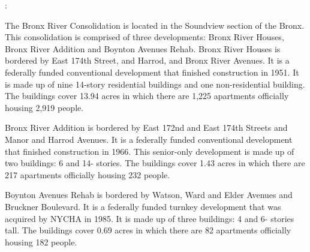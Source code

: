 :  

The Bronx River Consolidation is located in the Soundview section of the Bronx. This consolidation is comprised of three developments: Bronx River Houses, Bronx River Addition and Boynton Avenues Rehab. Bronx River Houses is bordered by East 174th Street, and Harrod, and Bronx River Avenues. It is a federally funded conventional development that finished construction in 1951. It is made up of nine 14-story residential buildings and one non-residential building. The buildings cover 13.94 acres in which there are 1,225 apartments officially housing 2,919 people.   

 

Bronx River Addition is bordered by East 172nd and East 174th Streets and Manor and Harrod Avenues. It is a federally funded conventional development that finished construction in 1966. This senior-only development is made up of two buildings: 6 and 14- stories. The buildings cover 1.43 acres in which there are 217 apartments officially housing 232 people.   

Boynton Avenues Rehab is bordered by Watson, Ward and Elder Avenues and Bruckner Boulevard. It is a federally funded turnkey development that was acquired by NYCHA in 1985. It is made up of three buildings: 4 and 6- stories tall. The buildings cover 0.69 acres in which there are 82 apartments officially housing 182 people.   

 